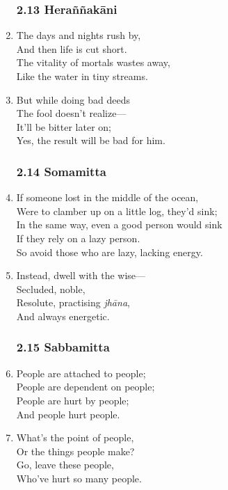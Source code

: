 \documentclass[10pt, openany]{book}
\begin{document}
\begin{enumerate}
\subsubsection*{2.13 Heraññakāni}

\item The days and nights rush by,\\
And then life is cut short.\\
The vitality of mortals wastes away,\\
Like the water in tiny streams.

\item But while doing bad deeds\\
The fool doesn’t realize—\\
It’ll be bitter later on;\\
Yes, the result will be bad for him.

\subsubsection*{2.14 Somamitta}

\item If someone lost in the middle of the ocean,\\
Were to clamber up on a little log, they’d sink;\\
In the same way, even a good person would sink\\
If they rely on a lazy person.\\
So avoid those who are lazy, lacking energy.

\item Instead, dwell with the wise—\\
Secluded, noble,\\
Resolute, practising \emph{jhāna},\\
And always energetic.

\subsubsection*{2.15 Sabbamitta}

\item People are attached to people;\\
People are dependent on people;\\
People are hurt by people;\\
And people hurt people.

\item What’s the point of people,\\
Or the things people make?\\
Go, leave these people,\\
Who’ve hurt so many people.


\end{enumerate}
\end{document}
